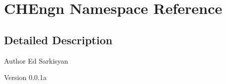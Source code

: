 \hypertarget{namespaceCHEngn}{
\section{CHEngn Namespace Reference}
\label{namespaceCHEngn}
}


\subsection{Detailed Description}
\begin{DoxyAuthor}{Author}
Ed Sarkisyan 
\end{DoxyAuthor}
\begin{DoxyVersion}{Version}
0.0.1a 
\end{DoxyVersion}
